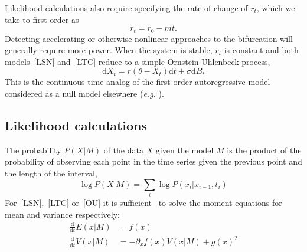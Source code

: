 \documentclass{pnastwo}
\newcommand{\ud}{\mathrm{d}}
\begin{document}
\begin{article}
Likelihood calculations also require specifying the rate of change of $r_t$, 
which we take to first order as
\begin{equation}
r_t = r_0 - m t.
\label{R_t}
\end{equation}
Detecting accelerating or otherwise nonlinear approaches to the bifurcation will generally require more power. 
When the system is stable, $r_t$ is constant and both models~\eqref{LSN} and~\eqref{LTC} reduce to a simple Ornstein-Uhlenbeck process, 
\begin{equation}
\ud X_t = r (\theta - X_t) \ud t + \sigma \ud B_t \label{OU}
\end{equation}
This is the continuous time analog of the first-order autoregressive model considered as a null model elsewhere (\emph{e.g.} \cite{Dakos2008, Guttal2008a}). 

\subsection{Likelihood calculations}\label{likelihood}
The probability $P(X|M)$ of the data $X$ given the model $M$ is the product of the probability of observing each point in the time series given the previous point and the length of the interval,  
\begin{equation}
\log P(X | M)=  \sum_i \log P(x_i | x_{i-1}, t_i)
\end{equation}
For~\eqref{LSN},~\eqref{LTC} or~\eqref{OU} it is sufficient~\cite{Gardiner2009} to solve the moment equations for mean and variance respectively:
\begin{align}
 \frac{\ud }{\ud t} E(x| M)&=  f(x) \\
\frac{\ud}{\ud t} V(x| M) &=  -\partial_x f(x) V(x|M) + g(x)^2 
  \label{general_moments}
\end{align}


\end{article}
\end{document}
